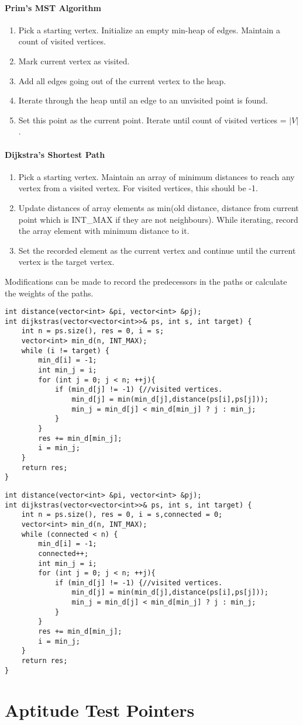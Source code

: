 \documentclass{report}
\begin{document}
\subsubsection*{Prim's MST Algorithm}
\begin{enumerate}
    \item Pick a starting vertex. Initialize an empty min-heap of edges. Maintain a count of visited vertices.
    \item Mark current vertex as visited.
    \item Add all edges going out of the current vertex to the heap.
    \item Iterate through the heap until an edge to an unvisited point is found.
    \item Set this point as the current point. Iterate until count of visited vertices = $|V|$.
\end{enumerate}
\subsubsection*{Dijkstra's Shortest Path}
\begin{enumerate}
    \item Pick a starting vertex. Maintain an array of minimum distances to reach any vertex from a visited vertex. For visited vertices, this should be -1.
    \item Update distances of array elements as min(old distance, distance from current point which is INT\_MAX if they are not neighbours). While iterating, record the array element with minimum distance to it. 
    \item Set the recorded element as the current vertex and continue until the current vertex is the target vertex.
\end{enumerate}
Modifications can be made to record the predecessors in the paths
or calculate the weights of the paths.
\begin{lstlisting}[caption=Shortest Path]
int distance(vector<int> &pi, vector<int> &pj);
int dijkstras(vector<vector<int>>& ps, int s, int target) {
    int n = ps.size(), res = 0, i = s;
    vector<int> min_d(n, INT_MAX);
    while (i != target) {
        min_d[i] = -1;
        int min_j = i;
        for (int j = 0; j < n; ++j){
            if (min_d[j] != -1) {//visited vertices.
                min_d[j] = min(min_d[j],distance(ps[i],ps[j]));
                min_j = min_d[j] < min_d[min_j] ? j : min_j;
            }
        }
        res += min_d[min_j];
        i = min_j;
    }
    return res;
}
\end{lstlisting}
\begin{lstlisting}[caption=Dijkstra's MST]
int distance(vector<int> &pi, vector<int> &pj);
int dijkstras(vector<vector<int>>& ps, int s, int target) {
    int n = ps.size(), res = 0, i = s,connected = 0;
    vector<int> min_d(n, INT_MAX);
    while (connected < n) {
        min_d[i] = -1;
        connected++;
        int min_j = i;
        for (int j = 0; j < n; ++j){
            if (min_d[j] != -1) {//visited vertices.
                min_d[j] = min(min_d[j],distance(ps[i],ps[j]));
                min_j = min_d[j] < min_d[min_j] ? j : min_j;
            }
        }
        res += min_d[min_j];
        i = min_j;
    }
    return res;
}
\end{lstlisting}
\chapter{Aptitude Test Pointers}

\end{document}

